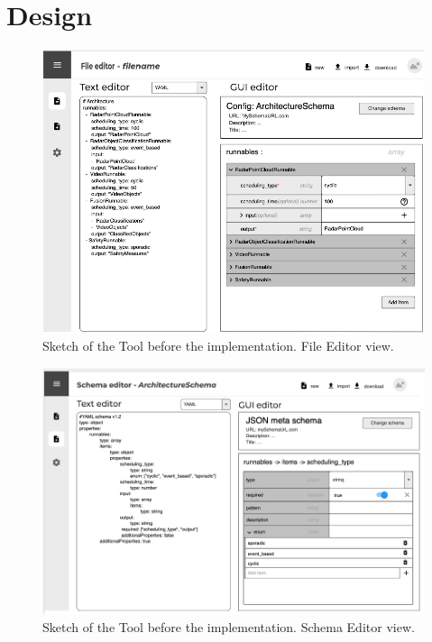 
\appendices




\section{Design}\label{sec:appendix-design}  %


\begin{figure}[!thb]
    \includegraphics[width=\textwidth]{figures/mockup_gui_config}
    \caption{Sketch of the Tool before the implementation. File Editor view.}
    \label{mockup_gui_config}
\end{figure}


\begin{figure}[!thb]
    \includegraphics[width=\textwidth]{figures/mockup_gui_schema}
    \caption{Sketch of the Tool before the implementation. Schema Editor view.}
    \label{mockup_gui_schema}
\end{figure}



